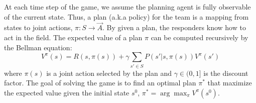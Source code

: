 At each time step of the game, we assume the planning agent is
fully observable of the current state. Thus, a plan (a.k.a policy)
for the team is a mapping from states to joint actions, $\pi: S
\rightarrow \vec{A}$. By given a plan, the responders know how to
act in the field. The expected value of a plan $\pi$ can be
computed recursively by the Bellman equation:
\begin{equation}
  V^\pi(s) = R(s, \pi(s)) + \gamma \sum_{s'\in S} P(s'|s, \pi(s)) V^\pi(s')
\end{equation}
where $\pi(s)$ is a joint action selected by the plan and $\gamma
\in (0, 1]$ is the discount factor. The goal of solving the game is
to find an optimal plan $\pi^*$ that maximize the expected value
given the initial state $s^0$, $\pi^* = \arg\max_{\pi} V^\pi(s^0)$.
